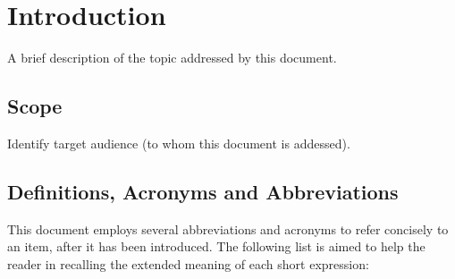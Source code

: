 \section{Introduction}
\label{sec:intro}

A brief description of the topic addressed by this document.


\subsection{Scope}
\label{sec:scope}

Identify target audience (to whom this document is addessed).


\subsection{Definitions, Acronyms and Abbreviations}
\label{sec:acronyms}

This document employs several abbreviations and acronyms to refer concisely to an item, after it has been introduced. The following list is aimed to help the reader in recalling the extended meaning of each short expression:

